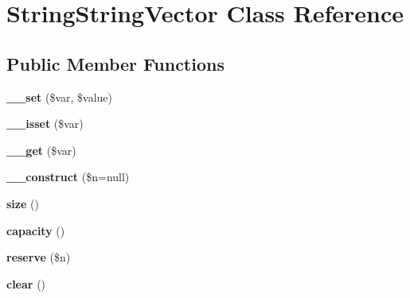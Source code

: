 \hypertarget{class_string_string_vector}{\section{String\-String\-Vector Class Reference}
\label{class_string_string_vector}
}
\subsection*{Public Member Functions}
\begin{DoxyCompactItemize}
\item 
\hypertarget{class_string_string_vector_a211c3109878e291845da1d10d4ee6c3e}{{\bfseries \-\_\-\-\_\-set} (\$var, \$value)}\label{class_string_string_vector_a211c3109878e291845da1d10d4ee6c3e}

\item 
\hypertarget{class_string_string_vector_a0f7ef6fc84b1c65dbe9e66961f7b6346}{{\bfseries \-\_\-\-\_\-isset} (\$var)}\label{class_string_string_vector_a0f7ef6fc84b1c65dbe9e66961f7b6346}

\item 
\hypertarget{class_string_string_vector_afd4ba25f63f1bba97930f1beb0111957}{{\bfseries \-\_\-\-\_\-get} (\$var)}\label{class_string_string_vector_afd4ba25f63f1bba97930f1beb0111957}

\item 
\hypertarget{class_string_string_vector_a9772a0b83be060a9e887d521ed2a16c7}{{\bfseries \-\_\-\-\_\-construct} (\$n=null)}\label{class_string_string_vector_a9772a0b83be060a9e887d521ed2a16c7}

\item 
\hypertarget{class_string_string_vector_ae26990a8bf018c8f5d4fa6c611b98f19}{{\bfseries size} ()}\label{class_string_string_vector_ae26990a8bf018c8f5d4fa6c611b98f19}

\item 
\hypertarget{class_string_string_vector_a2e3847f493a3b12d32dcf0a9ad73741d}{{\bfseries capacity} ()}\label{class_string_string_vector_a2e3847f493a3b12d32dcf0a9ad73741d}

\item 
\hypertarget{class_string_string_vector_a38035f8d51d588d6f6390f9c8ef23af3}{{\bfseries reserve} (\$n)}\label{class_string_string_vector_a38035f8d51d588d6f6390f9c8ef23af3}

\item 
\hypertarget{class_string_string_vector_a0cedd3e6512bb2c3b455326e0465f664}{{\bfseries clear} ()}\label{class_string_string_vector_a0cedd3e6512bb2c3b455326e0465f664}


\end{DoxyCompactItemize}
